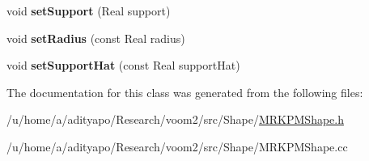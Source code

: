 \begin{DoxyCompactItemize}
\item 
\hypertarget{classvoom_1_1_m_r_k_p_m_shape_a8d7c436956ceb482e6acb0564ead5c4e}{
void {\bfseries setSupport} (Real support)}
\label{classvoom_1_1_m_r_k_p_m_shape_a8d7c436956ceb482e6acb0564ead5c4e}

\item 
\hypertarget{classvoom_1_1_m_r_k_p_m_shape_a28903ffc3acf8e78dd5ec4120bd0f7f0}{
void {\bfseries setRadius} (const Real radius)}
\label{classvoom_1_1_m_r_k_p_m_shape_a28903ffc3acf8e78dd5ec4120bd0f7f0}

\item 
\hypertarget{classvoom_1_1_m_r_k_p_m_shape_ad74e97c387e08a728bdec1951eca92e1}{
void {\bfseries setSupportHat} (const Real supportHat)}
\label{classvoom_1_1_m_r_k_p_m_shape_ad74e97c387e08a728bdec1951eca92e1}

\end{DoxyCompactItemize}


The documentation for this class was generated from the following files:\begin{DoxyCompactItemize}
\item 
/u/home/a/adityapo/Research/voom2/src/Shape/\hyperlink{_m_r_k_p_m_shape_8h}{MRKPMShape.h}\item 
/u/home/a/adityapo/Research/voom2/src/Shape/MRKPMShape.cc\end{DoxyCompactItemize}
